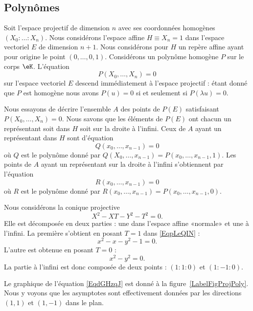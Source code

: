 \subsection{Polynômes}

Soit l'espace projectif de dimension \( n\) avec ses coordonnées homogènes \( (X_0:\ldots :X_n)\). Nous considérons l'espace affine \( H\equiv X_n=1\) dans l'espace vectoriel \( E\) de dimension \( n+1\). Nous considérons pour \( H\) un repère affine ayant pour origine le point \( (0,\ldots, 0,1)\). Considérons un polynôme homogène \( P\) sur le corps \( \eK\). L'équation
\begin{equation}
	P(X_0,\ldots, X_n)=0
\end{equation}
sur l'espace vectoriel \( E\) descend immédiatement à l'espace projectif : étant donné que \( P\) est homogène nous avons \( P(u)=0\) si et seulement si \( P(\lambda u)=0\).

Nous essayons de décrire l'ensemble \( A\) des points de \( P(E)\) satisfaisant \( P(X_0,\ldots, X_n)=0\). Nous savons que les éléments de \( P(E)\) ont chacun un représentant soit dans \( H\) soit sur la droite à l'infini. Ceux de \( A\) ayant un représentant dans \( H\) sont d'équation
\begin{equation}
	Q(x_0,\ldots, x_{n-1})=0
\end{equation}
où \( Q\) est le polynôme donné par \( Q(X_0,\ldots, x_{n-1})=P(x_0,\ldots, x_{n-1},1)\). Les points de \( A\) ayant un représentant sur la droite à l'infini s'obtiennent par l'équation
\begin{equation}
	R(x_0,\ldots, x_{n-1})=0
\end{equation}
où \( R\) est le polynôme donné par \( R(x_0,\ldots, x_{n-1})=P(x_0,\ldots, x_{n-1},0)\).

\begin{example}
	Nous considérons la conique projective
	\begin{equation}    \label{EqpLeQIN}
		X^2-XT-Y^2-T^2=0.
	\end{equation}
	Elle est décomposée en deux parties : une dans l'espace affine «normale» et une à l'infini. La première s'obtient en posant \( T=1\) dans \eqref{EqpLeQIN} :
	\begin{equation}    \label{EqdGHzqJ}
		x^2-x-y^2-1=0.
	\end{equation}
	L'autre est obtenue en posant \( T=0\) :
	\begin{equation}
		x^2-y^2=0.
	\end{equation}
	La partie à l'infini est donc composée de deux points : \( (1:1:0)\) et \( (1:-1:0)\).

	Le graphique de l'équation \eqref{EqdGHzqJ} est donné à la figure~\ref{LabelFigProjPoly}. Nous y voyons que les asymptotes sont effectivement données par les directions \( (1,1)\) et \( (1,-1)\) dans le plan.
	\newcommand{\CaptionFigProjPoly}{Le graphique de \( x^2-x-y^2-1=0\).}
	
\end{example}

